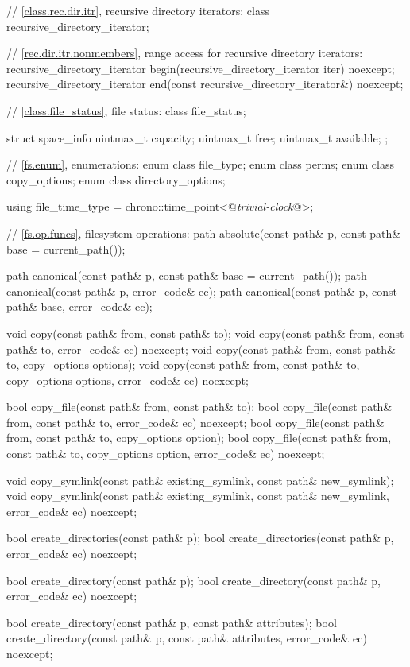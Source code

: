\begin{codeblock}
{  // \ref{class.rec.dir.itr}, recursive directory iterators:
  class recursive_directory_iterator;

  // \ref{rec.dir.itr.nonmembers}, range access for recursive directory iterators:
  recursive_directory_iterator begin(recursive_directory_iterator iter) noexcept;
  recursive_directory_iterator end(const recursive_directory_iterator&) noexcept;

  // \ref{class.file_status}, file status:
  class file_status;

  struct space_info {
    uintmax_t capacity;
    uintmax_t free;
    uintmax_t available;
  };

  // \ref{fs.enum}, enumerations:
  enum class file_type;
  enum class perms;
  enum class copy_options;
  enum class directory_options;

  using file_time_type = chrono::time_point<@\textit{trivial-clock}@>;

  // \ref{fs.op.funcs}, filesystem operations:
  path absolute(const path& p, const path& base = current_path());

  path canonical(const path& p, const path& base = current_path());
  path canonical(const path& p, error_code& ec);
  path canonical(const path& p, const path& base, error_code& ec);

  void copy(const path& from, const path& to);
  void copy(const path& from, const path& to, error_code& ec) noexcept;
  void copy(const path& from, const path& to, copy_options options);
  void copy(const path& from, const path& to, copy_options options,
            error_code& ec) noexcept;

  bool copy_file(const path& from, const path& to);
  bool copy_file(const path& from, const path& to, error_code& ec) noexcept;
  bool copy_file(const path& from, const path& to, copy_options option);
  bool copy_file(const path& from, const path& to, copy_options option,
                 error_code& ec) noexcept;

  void copy_symlink(const path& existing_symlink, const path& new_symlink);
  void copy_symlink(const path& existing_symlink, const path& new_symlink,
                    error_code& ec) noexcept;

  bool create_directories(const path& p);
  bool create_directories(const path& p, error_code& ec) noexcept;

  bool create_directory(const path& p);
  bool create_directory(const path& p, error_code& ec) noexcept;

  bool create_directory(const path& p, const path& attributes);
  bool create_directory(const path& p, const path& attributes,
                        error_code& ec) noexcept;

}
\end{codeblock}
